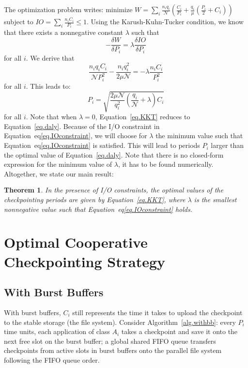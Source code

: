 \documentclass{article}
\newtheorem{theorem}{Theorem}
\newcommand{\nbnodesplat}{{\mathcal N}}
\newcommand{\app}[1]{A_{#1}}
\newcommand{\nbapp}[1]{n_{#1}}
\newcommand{\nbnodes}[1]{q_{#1}}
\newcommand{\period}[1]{P_{#1}}
\newcommand{\ckpt}[1]{C_{#1}}
\newcommand{\mtbfplat}{\mu}
\newcommand{\wasteplat}{W}
\newcommand{\ioconstraint}{\mathit{IO}}
\begin{document}
The optimization problem writes: minimize $\wasteplat = \sum_i \frac{\nbapp{i} \nbnodes{i}}{\nbnodesplat}  \left( \frac{\ckpt{i}}{\period{i}} +
\frac{\nbnodes{i}}{\mtbfplat}(\frac{\period{i}}{2} + \ckpt{i}) \right)$
subject to $\ioconstraint = \sum_{i} \frac{\nbapp{i} \ckpt{i}}{\period{i}} \leq 1$.
Using the Karush-Kuhn-Tucker condition, we know that there exists a nonnegative constant 
$\lambda$
such that 
$$- \frac{\delta \wasteplat}{\delta \period{i}} = \lambda \frac{\delta\ioconstraint }{\delta \period{i}}$$
for all $i$. We derive that 
$$\frac{\nbapp{i} \nbnodes{i} \ckpt{i}}{\nbnodesplat \period{i}^{2}} -    \frac{\nbapp{i} \nbnodes{i}^{2}}{2 \mtbfplat \nbnodesplat} = - \lambda \frac{\nbapp{i} \ckpt{i}}{\period{i}^{2}}
$$
for all $i$. This leads to:
 \begin{equation}
\period{i} = \sqrt{\frac{2 \mtbfplat  \nbnodesplat}{\nbnodes{i}^{2}} \left(\frac{\nbnodes{i}}{\nbnodesplat} +\lambda \right) \ckpt{i}}
  \label{eq.KKT}
\end{equation}
for all $i$. Note that when $\lambda=0$, Equation~\eqref{eq.KKT} reduces to Equation~\eqref{eq.daly}. Because of the I/O constraint in Equation~eq\ref{eq.IOconstraint},
we will choose for $\lambda$ the minimum value such that Equation~eq\ref{eq.IOconstraint}
  is satisfied. This will lead to periods $P_{i}$ larger than the optimal value of Equation~\eqref{eq.daly}. 
  Note that there is no closed-form expression for the minimum value of $\lambda$,
  it has to be found numerically.
   Altogether, we state our main result:
   
   \begin{theorem}
  In the presence of I/O constraints, the optimal values of the checkpointing periods are given
  by Equation~\eqref{eq.KKT}, where $\lambda$ is the smallest nonnegative value such that
  Equation~eq\ref{eq.IOconstraint} holds.
\end{theorem}

\section{Optimal Cooperative Checkpointing Strategy}
\label{sec.strategy}

\subsection{With Burst Buffers}

With burst buffers, $\ckpt{i}$ still represents the time it takes to
upload the checkpoint to the stable storage (the file system).
Consider Algorithm~\ref{alg.withbb}: every $\period{i}$ time
units, each application of class $\app{i}$ takes a checkpoint and save
it onto the next free slot on the burst buffer; a global shared FIFO
queue transfers checkpoints from active slots in burst buffers onto
the parallel file system following the FIFO queue order.
\end{document}

